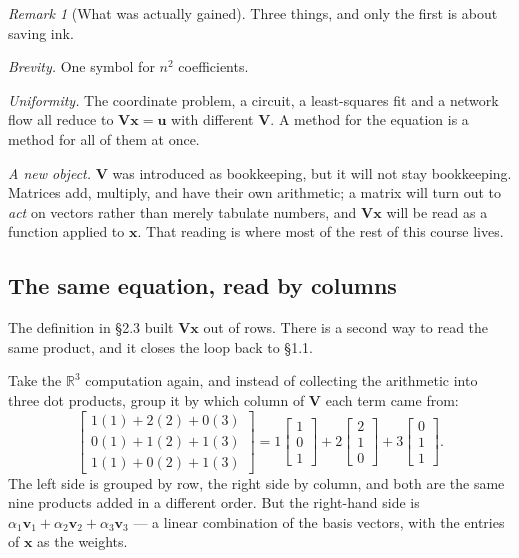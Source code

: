 \documentclass[11pt]{article}
\theoremstyle{plain}
\theoremstyle{definition}
\theoremstyle{remark}
\newtheorem*{rmk}{Remark}
\newcommand{\R}{\mathbb{R}}
\newcommand{\vc}[1]{\mathbf{#1}}        %
\newcommand{\mt}[1]{\mathbf{#1}}        %
\begin{document}
\begin{rmk}[What was actually gained]
Three things, and only the first is about saving ink.

\emph{Brevity.} One symbol for $n^{2}$ coefficients.

\emph{Uniformity.} The coordinate problem, a circuit, a least-squares fit and a
network flow all reduce to $\mt{V}\vc{x}=\vc{u}$ with different $\mt{V}$. A
method for the equation is a method for all of them at once.

\emph{A new object.} $\mt{V}$ was introduced as bookkeeping, but it will not
stay bookkeeping. Matrices add, multiply, and have their own arithmetic; a
matrix will turn out to \emph{act} on vectors rather than merely tabulate
numbers, and $\mt{V}\vc{x}$ will be read as a function applied to $\vc{x}$. That
reading is where most of the rest of this course lives.
\end{rmk}

\subsection{The same equation, read by columns}
The definition in \S2.3 built $\mt{V}\vc{x}$ out of rows. There is a second way
to read the same product, and it closes the loop back to \S1.1.

Take the $\R^{3}$ computation again, and instead of collecting the arithmetic
into three dot products, group it by which column of $\mt{V}$ each term came
from:
\[
  \begin{bmatrix}
    1(1) + 2(2) + 0(3) \\
    0(1) + 1(2) + 1(3) \\
    1(1) + 0(2) + 1(3)
  \end{bmatrix}
  =
  1\begin{bmatrix} 1 \\ 0 \\ 1 \end{bmatrix}
  + 2\begin{bmatrix} 2 \\ 1 \\ 0 \end{bmatrix}
  + 3\begin{bmatrix} 0 \\ 1 \\ 1 \end{bmatrix} .
\]
The left side is grouped by row, the right side by column, and both are the same
nine products added in a different order. But the right-hand side is
$\alpha_1\vc{v}_1+\alpha_2\vc{v}_2+\alpha_3\vc{v}_3$ --- a linear combination of
the basis vectors, with the entries of $\vc{x}$ as the weights.
\end{document}
